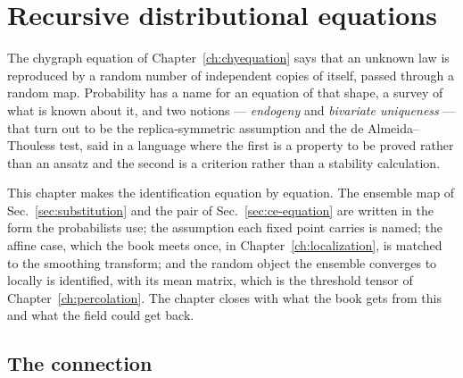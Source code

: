 \chapter{Recursive distributional equations}
\label{ch:rde}


The chygraph equation of Chapter~\ref{ch:chyequation} says that an unknown
law is reproduced by a random number of independent copies of itself, passed
through a random map. Probability has a name for an equation of that shape,
a survey of what is known about it, and two notions --- \emph{endogeny} and
\emph{bivariate uniqueness} --- that turn out to be the replica-symmetric
assumption and the de Almeida--Thouless test, said in a language where the
first is a property to be proved rather than an ansatz and the second is a
criterion rather than a stability calculation.

This chapter makes the identification equation by equation. The ensemble map
of Sec.~\ref{sec:substitution} and the pair of Sec.~\ref{sec:ce-equation}
are written in the form the probabilists use; the assumption each fixed
point carries is named; the affine case, which the book meets once, in
Chapter~\ref{ch:localization}, is matched to the smoothing transform; and
the random object the ensemble converges to locally is identified, with its
mean matrix, which is the threshold tensor of Chapter~\ref{ch:percolation}.
The chapter closes with what the book gets from this and what the field
could get back.

\section{The connection}
\label{sec:rde-connection}


